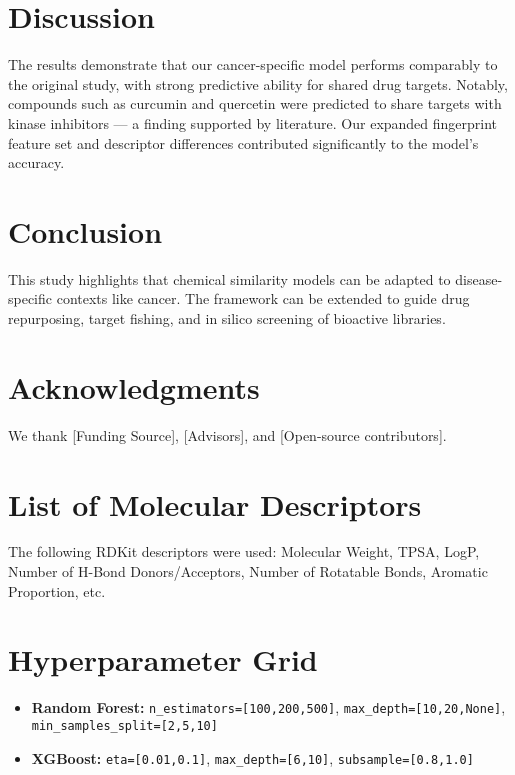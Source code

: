 \documentclass[11pt,a4paper]{article}
\begin{document}
\section{Discussion}
The results demonstrate that our cancer-specific model performs comparably to the original study, with strong predictive ability for shared drug targets. Notably, compounds such as curcumin and quercetin were predicted to share targets with kinase inhibitors — a finding supported by literature. Our expanded fingerprint feature set and descriptor differences contributed significantly to the model’s accuracy.

\section{Conclusion}
This study highlights that chemical similarity models can be adapted to disease-specific contexts like cancer. The framework can be extended to guide drug repurposing, target fishing, and in silico screening of bioactive libraries.

\section*{Acknowledgments}
We thank [Funding Source], [Advisors], and [Open-source contributors].




\appendix
\section{List of Molecular Descriptors}
The following RDKit descriptors were used: Molecular Weight, TPSA, LogP, Number of H-Bond Donors/Acceptors, Number of Rotatable Bonds, Aromatic Proportion, etc.

\section{Hyperparameter Grid}
\begin{itemize}
    \item \textbf{Random Forest:} \texttt{n\_estimators=[100,200,500]}, \texttt{max\_depth=[10,20,None]}, \texttt{min\_samples\_split=[2,5,10]}
    \item \textbf{XGBoost:} \texttt{eta=[0.01,0.1]}, \texttt{max\_depth=[6,10]}, \texttt{subsample=[0.8,1.0]}
\end{itemize}
\end{document}

